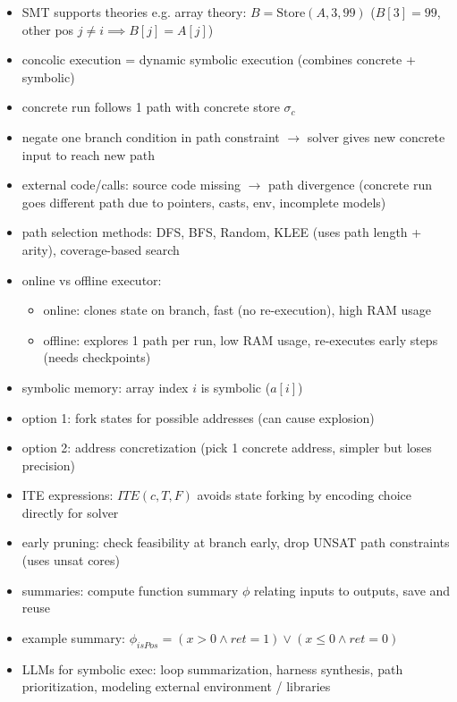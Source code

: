 \begin{itemize}
\item SMT supports theories e.g. array theory: $B = \text{Store}(A, 3, 99)$ ($B[3]=99$, other pos $j \neq i \implies B[j] = A[j]$)

\item concolic execution = dynamic symbolic execution (combines concrete + symbolic)
\item concrete run follows 1 path with concrete store $\sigma_c$
\item negate one branch condition in path constraint $\rightarrow$ solver gives new concrete input to reach new path

\item external code/calls: source code missing $\rightarrow$ path divergence (concrete run goes different path due to pointers, casts, env, incomplete models)

\item path selection methods: DFS, BFS, Random, KLEE (uses path length + arity), coverage-based search

\item online vs offline executor:
\begin{itemize}
    \item online: clones state on branch, fast (no re-execution), high RAM usage
    \item offline: explores 1 path per run, low RAM usage, re-executes early steps (needs checkpoints)
\end{itemize}

\item symbolic memory: array index $i$ is symbolic ($a[i]$)
\item option 1: fork states for possible addresses (can cause explosion)
\item option 2: address concretization (pick 1 concrete address, simpler but loses precision)

\item ITE expressions: $ITE(c, T, F)$ avoids state forking by encoding choice directly for solver

\item early pruning: check feasibility at branch early, drop UNSAT path constraints (uses unsat cores)

\item summaries: compute function summary $\phi$ relating inputs to outputs, save and reuse
\item example summary: $\phi_{isPos} = (x > 0 \land ret = 1) \lor (x \leq 0 \land ret = 0)$

\item LLMs for symbolic exec: loop summarization, harness synthesis, path prioritization, modeling external environment / libraries
\end{itemize}

